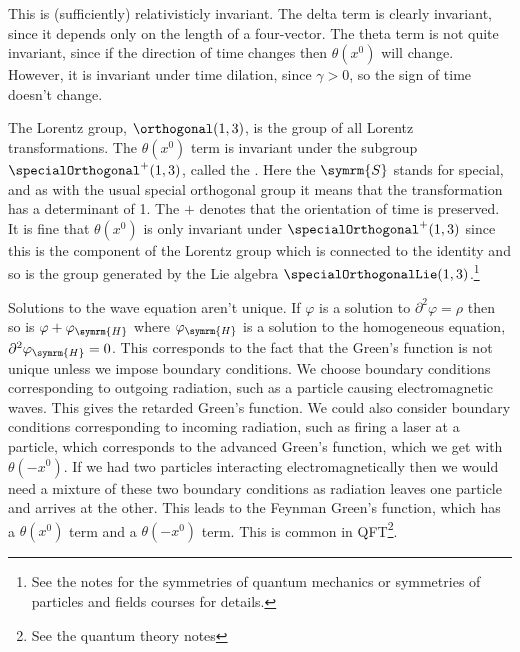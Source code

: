 \documentclass[fleqn]{NotesClass}
\newcommand*{\dalembertian}{\partial^2}
\begin{document}
    This is (sufficiently) relativisticly invariant.
    The delta term is clearly invariant, since it depends only on the length of a four-vector.
    The theta term is not quite invariant, since if the direction of time changes then \(\theta(x^0)\) will change.
    However, it is invariant under time dilation, since \(\gamma > 0\), so the sign of time doesn't change.
    
    The Lorentz group, \(\orthogonal(1, 3)\), is the group of all Lorentz transformations.
    The \(\theta(x^0)\) term is invariant under the subgroup \(\specialOrthogonal^+(1, 3)\), called the .
    Here the \(\symrm{S}\) stands for special, and as with the usual special orthogonal group it means that the transformation has a determinant of 1.
    The \(+\) denotes that the orientation of time is preserved.
    It is fine that \(\theta(x^0)\) is only invariant under \(\specialOrthogonal^+(1, 3)\) since this is the component of the Lorentz group which is connected to the identity and so is the group generated by the Lie algebra \(\specialOrthogonalLie(1, 3)\).\footnote{See the notes for the symmetries of quantum mechanics or symmetries of particles and fields courses for details.}
    
    Solutions to the wave equation aren't unique.
    If \(\varphi\) is a solution to \(\dalembertian \varphi = \rho\) then so is \(\varphi + \varphi_{\symrm{H}}\) where \(\varphi_{\symrm{H}}\) is a solution to the homogeneous equation, \(\dalembertian \varphi_{\symrm{H}} = 0\).
    This corresponds to the fact that the Green's function is not unique unless we impose boundary conditions.
    We choose boundary conditions corresponding to outgoing radiation, such as a particle causing electromagnetic waves.
    This gives the retarded Green's function.
    We could also consider boundary conditions corresponding to incoming radiation, such as firing a laser at a particle, which corresponds to the advanced Green's function, which we get with \(\theta(-x^0)\).
    If we had two particles interacting electromagnetically then we would need a mixture of these two boundary conditions as radiation leaves one particle and arrives at the other.
    This leads to the Feynman Green's function, which has a \(\theta(x^0)\) term and a \(\theta(-x^0)\) term.
    This is common in QFT\footnote{See the quantum theory notes}.
    
    
    \backmatter
    \printindex
\end{document}
